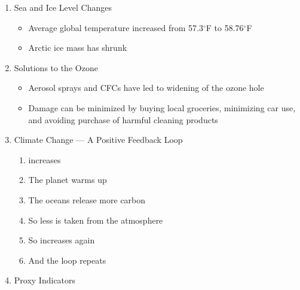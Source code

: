 \documentclass[12pt]{article}
\begin{document}
\begin{enumerate}
\begin{itemize}
\begin{enumerate}
        \end{enumerate}

    \end{itemize}

  \item Sea and Ice Level Changes

    \begin{itemize}

      \item Average global temperature increased from 57.3$^{\circ}$F to 58.76$^{\circ}$F

      \item Arctic ice mass has shrunk

    \end{itemize}

  \item Solutions to the Ozone

    \begin{itemize}

      \item Aerosol sprays and CFCs have led to widening of the ozone hole

      \item Damage can be minimized by buying local groceries, minimizing car use, and avoiding purchase of harmful cleaning products

    \end{itemize}

  \item Climate Change — A Positive Feedback Loop

    \begin{enumerate}

      \item {} increases

      \item The planet warms up

      \item The oceans release more carbon

      \item So less  is taken from the atmosphere

      \item So  increases again

      \item And the loop repeats

    \end{enumerate}

  \item Proxy Indicators


\end{enumerate}
\end{document}
